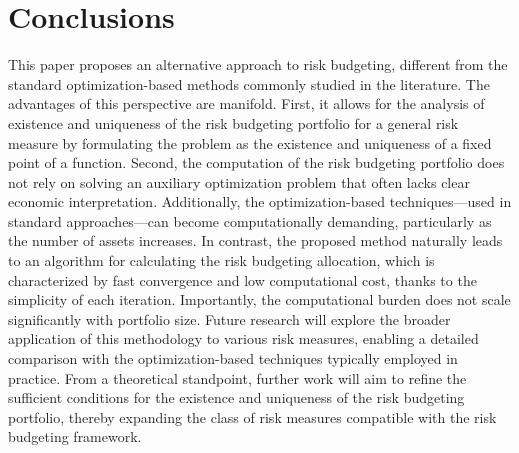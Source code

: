 \documentclass[preprint,11pt,authoryear]{elsarticle}
\begin{document}
\section{Conclusions}
\label{sec:conclusions}
This paper proposes an alternative approach to risk budgeting, different from the standard optimization-based methods commonly studied in the literature. The advantages of this perspective are manifold. First, it allows for the analysis of existence and uniqueness of the risk budgeting portfolio for a general risk measure by formulating the problem as the existence and uniqueness of a fixed point of a function. Second, the computation of the risk budgeting portfolio does not rely on solving an auxiliary optimization problem that often lacks clear economic interpretation. Additionally, the optimization-based techniques—used in standard approaches—can become computationally demanding, particularly as the number of assets increases. In contrast, the proposed method naturally leads to an algorithm for calculating the risk budgeting allocation, which is characterized by fast convergence and low computational cost, thanks to the simplicity of each iteration. Importantly, the computational burden does not scale significantly with portfolio size. Future research will explore the broader application of this methodology to various risk measures, enabling a detailed comparison with the optimization-based techniques typically employed in practice. From a theoretical standpoint, further work will aim to refine the sufficient conditions for the existence and uniqueness of the risk budgeting portfolio, thereby expanding the class of risk measures compatible with the risk budgeting framework.





\end{document}
